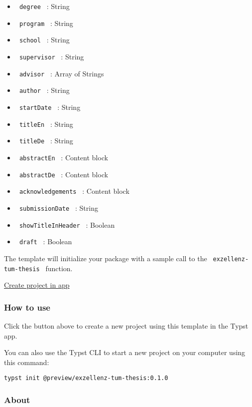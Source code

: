 \begin{itemize}
\tightlist
\item
  \texttt{\ degree\ } : String
\item
  \texttt{\ program\ } : String
\item
  \texttt{\ school\ } : String
\item
  \texttt{\ supervisor\ } : String
\item
  \texttt{\ advisor\ } : Array of Strings
\item
  \texttt{\ author\ } : String
\item
  \texttt{\ startDate\ } : String
\item
  \texttt{\ titleEn\ } : String
\item
  \texttt{\ titleDe\ } : String
\item
  \texttt{\ abstractEn\ } : Content block
\item
  \texttt{\ abstractDe\ } : Content block
\item
  \texttt{\ acknowledgements\ } : Content block
\item
  \texttt{\ submissionDate\ } : String
\item
  \texttt{\ showTitleInHeader\ } : Boolean
\item
  \texttt{\ draft\ } : Boolean
\end{itemize}

The template will initialize your package with a sample call to the
\texttt{\ exzellenz-tum-thesis\ } function.

\href{/app?template=exzellenz-tum-thesis&version=0.1.0}{Create project
in app}

\subsubsection{How to use}\label{how-to-use}

Click the button above to create a new project using this template in
the Typst app.

You can also use the Typst CLI to start a new project on your computer
using this command:

\begin{verbatim}
typst init @preview/exzellenz-tum-thesis:0.1.0
\end{verbatim}



\subsubsection{About}\label{about}

